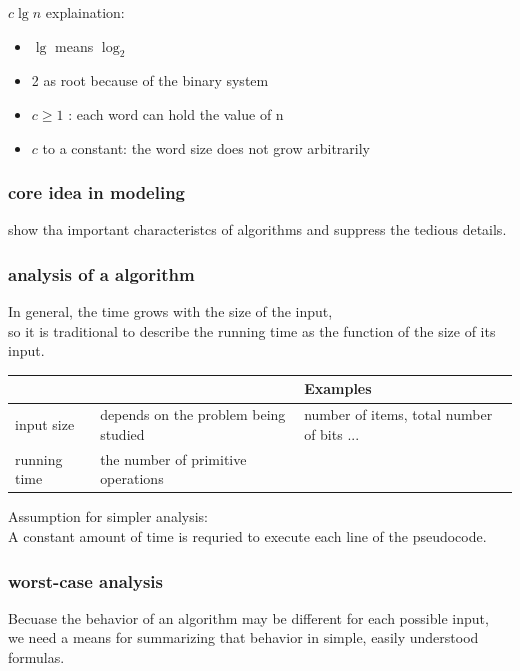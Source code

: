 \documentclass[11pt]{article}
\begin{document}
$c\lg n$ explaination: \\
\begin{itemize}
\item $\lg$ means $\log_2$ \\
\item 2 as root because of the binary system \\
\item $c\ge1$ : each word can hold the value of n \\
\item $c$ to a constant: the word size does not grow arbitrarily \\
\end{itemize}

\subsubsection{core idea in modeling}
\label{sec-2-2-7}
show tha important characteristcs of algorithms and suppress the tedious details. \\



\subsubsection{analysis of a algorithm}
\label{sec-2-2-8}
In general, the time grows with the size of the input, \\
so it is traditional to describe the running time as the function of the size of its input. \\

\begin{center}
\begin{tabular}{|l|l|l|}
\hline
 & & Examples \\
\hline
input size & depends on the problem being studied & number of items, total number of bits ... \\
\hline
running time & the number of primitive operations & \\
\hline
\end{tabular}
\end{center}

Assumption for simpler analysis: \\
A constant amount of time is requried to execute each line of the pseudocode. \\



\subsubsection{worst-case analysis}
\label{sec-2-2-9}
Becuase the behavior of an algorithm may be different for each possible input, \\
we need a means for summarizing that behavior in simple, easily understood formulas. \\
\end{document}

